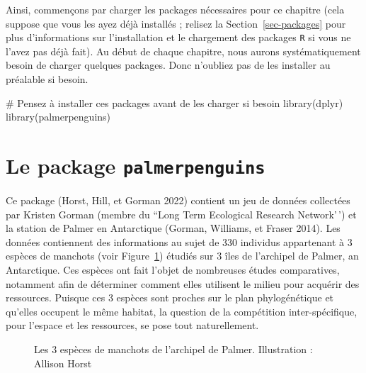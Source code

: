 \documentclass[
  a4paper,
  DIV=11,
  numbers=noendperiod,
  oneside]{scrreprt}
\newenvironment{Shaded}{}{}
\newcommand{\CommentTok}[1]{\textcolor[rgb]{0.42,0.45,0.49}{#1}}
\newcommand{\FunctionTok}[1]{\textcolor[rgb]{0.44,0.26,0.76}{#1}}
\newcommand{\NormalTok}[1]{\textcolor[rgb]{0.14,0.16,0.18}{#1}}
\begin{document}
Ainsi, commençons par charger les packages nécessaires pour ce chapitre
(cela suppose que vous les ayez déjà installés ; relisez la
Section~\ref{sec-packages} pour plus d'informations sur l'installation
et le chargement des packages \texttt{R} si vous ne l'avez pas déjà
fait). Au début de chaque chapitre, nous aurons systématiquement besoin
de charger quelques packages. Donc n'oubliez pas de les installer au
préalable si besoin.

\begin{Shaded}
\begin{Highlighting}[]
\CommentTok{\# Pensez à installer ces packages avant de les charger si besoin }
\FunctionTok{library}\NormalTok{(dplyr)}
\FunctionTok{library}\NormalTok{(palmerpenguins)}
\end{Highlighting}
\end{Shaded}

\section{\texorpdfstring{Le package
\texttt{palmerpenguins}}{Le package palmerpenguins}}\label{le-package-palmerpenguins}

Ce package (Horst, Hill, et Gorman 2022) contient un jeu de données
collectées par Kristen Gorman (membre du ``Long Term Ecological Research
Network'\,') et la station de Palmer en Antarctique (Gorman, Williams,
et Fraser 2014). Les données contiennent des informations au sujet de
330 individus appartenant à 3 espèces de manchots (voir
Figure~\ref{fig-ppenguins}) étudiés sur 3 îles de l'archipel de Palmer,
an Antarctique. Ces espèces ont fait l'objet de nombreuses études
comparatives, notamment afin de déterminer comment elles utilisent le
milieu pour acquérir des ressources. Puisque ces 3 espèces sont proches
sur le plan phylogénétique et qu'elles occupent le même habitat, la
question de la compétition inter-spécifique, pour l'espace et les
ressources, se pose tout naturellement.

\begin{figure}


\caption{\label{fig-ppenguins}Les 3 espèces de manchots de l'archipel de
Palmer. Illustration : Allison Horst}

\end{figure}%
\end{document}
